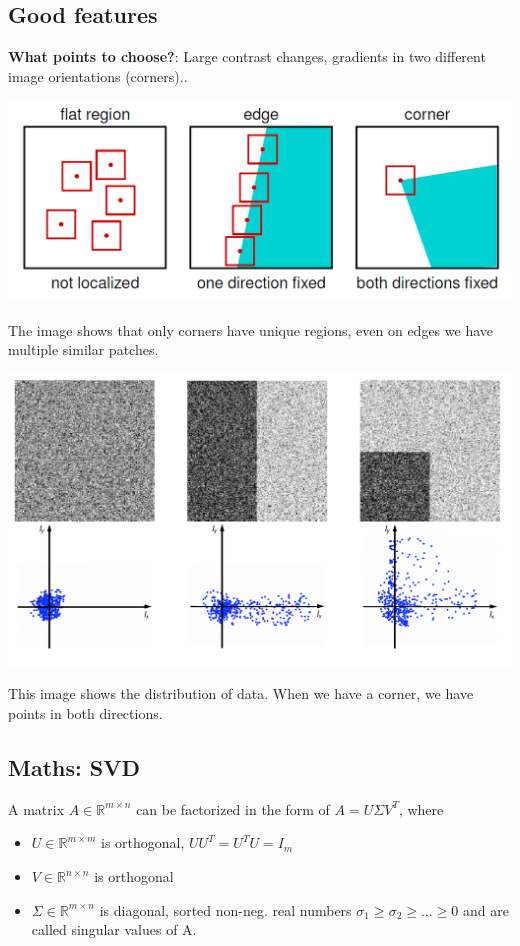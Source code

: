 \subsection{Good features}
\textbf{What points to choose?}: Large contrast changes, gradients in two different image orientations (corners)..

\includegraphics[width=.7\textwidth]{images/chap3/good_feature}

The image shows that only corners have unique regions, even on edges we have multiple similar patches.

\includegraphics[width=.7\textwidth]{images/chap3/feature_dist}

This image shows the distribution of data. When we have a corner, we have points in both directions.

\subsection{Maths: SVD}

A matrix $A \in \mathbb{R}^{m\times n}$ can be factorized in the form of $A = U \Sigma V^T$, where

\begin{itemize}
    \item $U \in \mathbb{R}^{m\times m}$ is orthogonal, $UU^T = U^T U = I_m$
    \item $V \in \mathbb{R}^{n \times n}$ is orthogonal 
    \item $\Sigma \in \mathbb{R}^{m\times n}$ is diagonal, sorted non-neg. real numbers $\sigma_1 \geq \sigma_2 \geq ... \geq 0$ and are called singular values of A.
\end{itemize}

